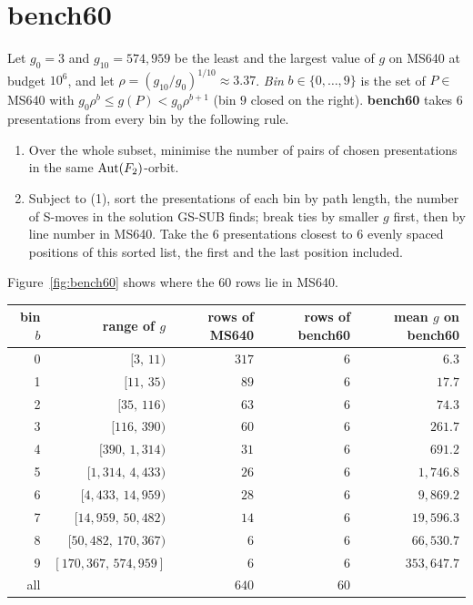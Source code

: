 \section{bench60}\label{app:bench60}

\begin{definition}\label{def:bench60full}
Let $g_0=3$ and $g_{10}=574{,}959$ be the least and the largest value of $g$ on MS640 at budget $10^6$, and
let $\rho=(g_{10}/g_0)^{1/10}\approx3.37$. \emph{Bin} $b\in\{0,\dots,9\}$ is the set of $P\in$ MS640 with
$g_0\rho^{b}\le g(P)<g_0\rho^{b+1}$ (bin $9$ closed on the right). \textbf{bench60} takes $6$ presentations from every
bin by the following rule.
\begin{enumerate}
  \item Over the whole subset, minimise the number of pairs of chosen presentations in the same $\operatorname{Aut}(F_2)$-orbit.
  \item Subject to (1), sort the presentations of each bin by path length, the number of S-moves in the solution GS-SUB finds; break ties by smaller $g$ first, then by line number in MS640.
  Take the $6$ presentations closest to $6$ evenly spaced positions of this sorted list, the first and the last
  position included.
\end{enumerate}
\end{definition}

Figure~\ref{fig:bench60} shows where the $60$ rows lie in MS640.

\begin{center}
\begin{tabular}{rrrrr}
\toprule
bin $b$ & range of $g$ & rows of MS640 & rows of bench60 & mean $g$ on bench60\\
\midrule
0 & $[3,\,11)$ & $317$ & $6$ & $6.3$\\
1 & $[11,\,35)$ & $89$ & $6$ & $17.7$\\
2 & $[35,\,116)$ & $63$ & $6$ & $74.3$\\
3 & $[116,\,390)$ & $60$ & $6$ & $261.7$\\
4 & $[390,\,1{,}314)$ & $31$ & $6$ & $691.2$\\
5 & $[1{,}314,\,4{,}433)$ & $26$ & $6$ & $1{,}746.8$\\
6 & $[4{,}433,\,14{,}959)$ & $28$ & $6$ & $9{,}869.2$\\
7 & $[14{,}959,\,50{,}482)$ & $14$ & $6$ & $19{,}596.3$\\
8 & $[50{,}482,\,170{,}367)$ & $6$ & $6$ & $66{,}530.7$\\
9 & $[170{,}367,\,574{,}959]$ & $6$ & $6$ & $353{,}647.7$\\
\midrule
all & & $640$ & $60$ & \\
\bottomrule
\end{tabular}
\end{center}

